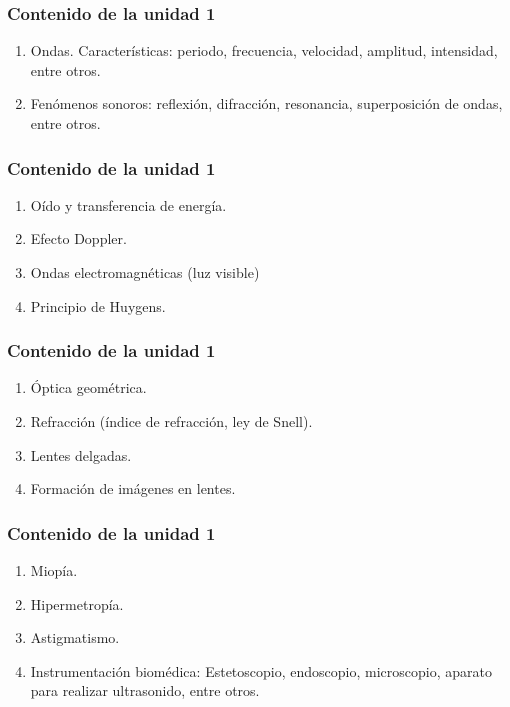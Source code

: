 \documentclass[14pt]{beamer}
\begin{document}
\begin{frame}
\frametitle{Contenido de la unidad 1}
\begin{enumerate}[<+->]
\item Ondas. Características: periodo, frecuencia, velocidad, amplitud, intensidad, entre otros.
\item Fenómenos sonoros: reflexión, difracción, resonancia, superposición de ondas, entre otros.
\seti
\end{enumerate}
\end{frame}
\begin{frame}
\frametitle{Contenido de la unidad 1}
\begin{enumerate}[<+->]
\conti
\item Oído y transferencia de energía.
\item Efecto Doppler.
\item Ondas electromagnéticas (luz visible)
\item Principio de Huygens.
\seti
\end{enumerate}
\end{frame}
\begin{frame}
\frametitle{Contenido de la unidad 1}
\begin{enumerate}[<+->]
\conti
\item Óptica geométrica.
\item Refracción (índice de refracción, ley de Snell).
\item Lentes delgadas.
\item Formación de imágenes en lentes.
\seti
\end{enumerate}
\end{frame}
\begin{frame}
\frametitle{Contenido de la unidad 1}
\begin{enumerate}[<+->]
\conti
\item Miopía.
\item Hipermetropía.
\item Astigmatismo.
\item Instrumentación biomédica: Estetoscopio, endoscopio, microscopio, aparato para realizar ultrasonido, entre otros.
\end{enumerate}
\end{frame}
\end{document}
